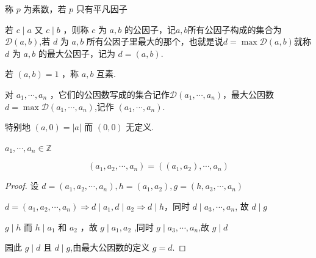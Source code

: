 \begin{definition}
	称 $p$ 为素数，若 $p$ 只有平凡因子
\end{definition}
\begin{definition}
	若 $c \mid a$ 又 $c \mid b$ ，则称 $c$ 为 $a,b$ 的公因子，记$a,b$所有公因子构成的集合为$\mathscr{D}(a,b)$,若 $d$ 为 $a, b$ 所有公因子里最大的那个，也就是说$d=\max\mathscr{D}(a,b)$就称 $d$ 为 $a, b$ 的最大公因子，记为 $d=(a, b)$.
	
	若 $(a, b)=1$ ，称 $a, b$ 互素.
	
	对 $a_1, \cdots, a_n$ ，它们的公因数写成的集合记作$\mathscr{D}(a_1,\cdots,a_n)$，最大公因数$d=\max\mathscr{D}(a_1, \cdots, a_n)$,记作 $\left(a_1, \cdots, a_n\right) $.
	
	
	特别地 $(a, 0)=|a|$ 而 $(0,0)$ 无定义.
\end{definition}
\begin{theorem}
	$ a_1, \cdots, a_n \in \mathbb{Z}$
	
	$$
	\left(a_1, a_2, \cdots, a_n\right)=\left(\left(a_1, a_2\right), \cdots, a_n\right)
	$$
	
	
	
\end{theorem}
\begin{proof}
	设 $d=\left(a_1, a_2, \cdots, a_n\right) , h=\left(a_1, a_2\right) , g=\left(h, a_3, \cdots, a_n\right)$
	
	$ d=\left(a_1, a_2, \cdots, a_n\right) \Rightarrow d\mid a_1, d\mid  a_2 \Rightarrow d \mid h$，同时 $ d \mid a_3, \cdots, a_n$, 故 $d \mid g $
	
	$g \mid h$ 而 $h \mid a_1$ 和 $a_2$ ，故 $g \mid a_1, a_2$ ,同时 $g \mid a_3, \cdots, a_n$,故 $g \mid d$
	
	园此 $g \mid d$ 且 $d \mid g$,由最大公因数的定义 $g=d$.
\end{proof}

